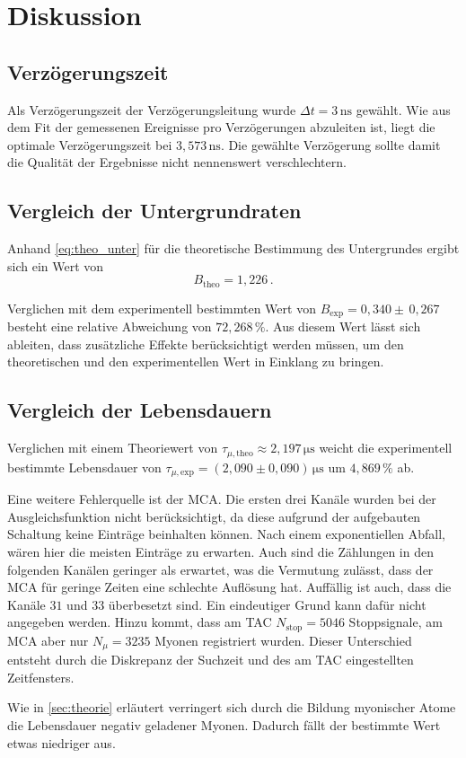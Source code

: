 \section{Diskussion}
\label{sec:Diskussion}

\subsection{Verzögerungszeit}

Als Verzögerungszeit der Verzögerungsleitung wurde $\Delta t = 3 \,\unit{\nano\second}$ gewählt.
Wie aus dem Fit der gemessenen Ereignisse pro Verzögerungen abzuleiten ist, liegt die optimale Verzögerungszeit bei
$3,573 \,\unit{\nano\second}$. Die gewählte Verzögerung sollte damit die Qualität der Ergebnisse nicht nennenswert verschlechtern.


\subsection{Vergleich der Untergrundraten}

Anhand \eqref{eq:theo_unter} für die theoretische Bestimmung des Untergrundes ergibt sich ein Wert von
\begin{equation}
    B_\text{theo} = 1,226 \,.
\end{equation}

Verglichen mit dem experimentell bestimmten Wert von $B_\text{exp} = 0,340 \pm \, 0,267$ besteht eine relative Abweichung von
$72,268 \,\%$. Aus diesem Wert lässt sich ableiten, dass zusätzliche Effekte berücksichtigt werden müssen, um den theoretischen und den experimentellen Wert in Einklang zu bringen.

\subsection{Vergleich der Lebensdauern}

Verglichen mit einem Theoriewert von $\tau_{\mu,\text{theo}} \approx 2,197 \,\unit{\micro\second}$ \cite{pdg} weicht die experimentell bestimmte Lebensdauer von
$\tau_{\mu,\text{exp}} =  \left(2,090  \pm 0,090 \right) \,\unit{\micro\second}$ um $4,869 \,\%$  ab.

Eine weitere Fehlerquelle ist der MCA. Die ersten drei Kanäle wurden bei der Ausgleichsfunktion nicht berücksichtigt, da diese aufgrund der aufgebauten Schaltung keine Einträge beinhalten können.
 Nach einem exponentiellen Abfall, wären hier die meisten Einträge zu erwarten. 
Auch sind die Zählungen in den folgenden Kanälen geringer als erwartet, was die Vermutung zulässt, dass der MCA für geringe Zeiten eine schlechte Auflösung hat.
Auffällig ist auch, dass die Kanäle $31$ und $33$ überbesetzt sind. Ein eindeutiger Grund kann dafür nicht angegeben werden.
Hinzu kommt, dass am TAC $N_\text{stop} = 5046$ Stoppsignale, am MCA aber nur $N_{\mu} = 3235$ Myonen registriert wurden.
Dieser Unterschied entsteht durch die Diskrepanz der Suchzeit und des am TAC eingestellten Zeitfensters.

Wie in \autoref{sec:theorie} erläutert verringert sich durch die Bildung myonischer Atome die Lebensdauer
negativ geladener Myonen. Dadurch fällt der bestimmte Wert etwas niedriger aus. \\

